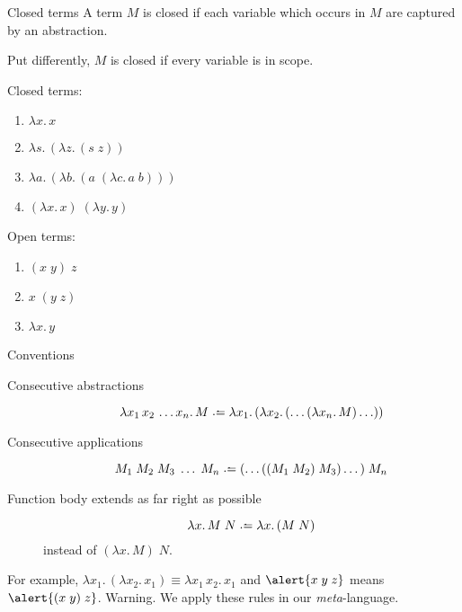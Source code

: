\begin{frame}{Closed terms}
  A term $M$ is \alert{closed} if each variable which occurs in $M$ are captured by an abstraction.

  Put differently, $M$ is closed if every variable is in scope.

  Closed terms:
  \begin{enumerate}
    \item $\lambda x.\, x$
    \item $\lambda s.\,(\lambda z.\, (s \;z))$
    \item $\lambda a.\,(\lambda b.\, (a\;(\lambda c.\, a\; b)))$
    \item $(\lambda x.\, x)\;(\lambda y.\, y)$
  \end{enumerate}
  Open terms:
  \begin{enumerate}
    \item $(x\;y)\;z$
    \item $x\;(y\; z)$
    \item $\lambda x.\, y$
  \end{enumerate}
\end{frame}

\begin{frame}{Conventions}
  \begin{description}
    \item[Consecutive abstractions]
      \[
        \lambda x_1\,x_2\,\ldots x_n.\, M \defeq \lambda x_1.\,(\lambda x_2.\,(\ldots (\lambda x_n.\, M)\ldots))
      \]
    \item[Consecutive applications]
      \[
        M_1\;M_2\; M_3\; \dots\;M_n \defeq (\dots((M_1\;M_2)\;M_3) \dots )\; M_n
      \]
    \item[Function body extends as far right as possible]
      \[
        \lambda x.\, M\;N \defeq \lambda x.\,(M\; N)
      \]
      instead of $(\lambda x.\,M)\; N$.
  \end{description}
  For example, 
      $\lambda x_1.\,(\lambda x_2.\, x_1) \equiv \lambda x_1\,x_2.\,x_1$
      and
      $\alert{x\;y\;z}$ means $\alert{(x\; y)\;z}$. 
  \alert{Warning}. We apply these rules in our \emph{meta}-language.
\end{frame}

